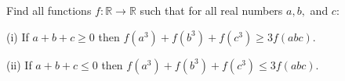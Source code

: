 Find all functions $f:\mathbb{R}\to \mathbb{R}$ such that for all real numbers $a,b,$ and $c$:

(i) If $a+b+c\ge 0$ then $f(a^3)+f(b^3)+f(c^3)\ge 3f(abc).$

(ii) If $a+b+c\le 0$ then $f(a^3)+f(b^3)+f(c^3)\le 3f(abc).$

